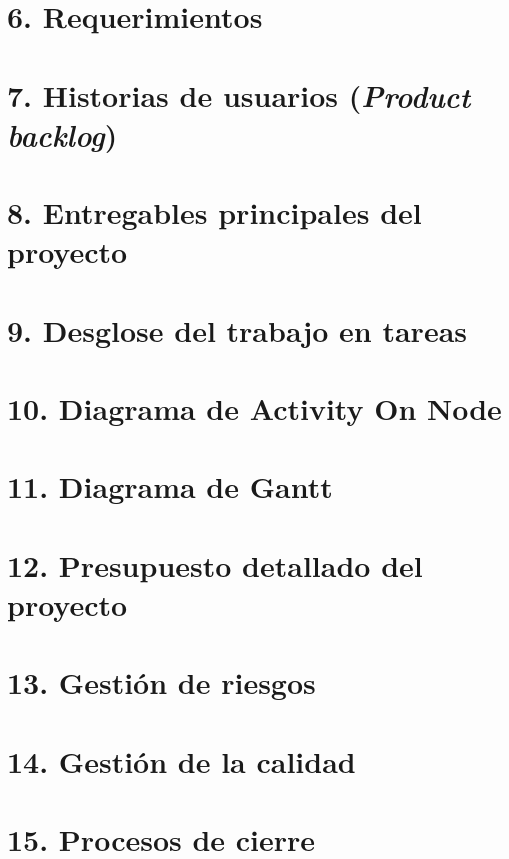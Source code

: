 \documentclass[
11pt, %
codirector, %
]{charter}
\begin{document}


\section{6. Requerimientos}
\label{sec:requerimientos}



\section{7. Historias de usuarios (\textit{Product backlog})}
\label{sec:backlog}



\section{8. Entregables principales del proyecto}
\label{sec:entregables}



\section{9. Desglose del trabajo en tareas}
\label{sec:wbs}



\section{10. Diagrama de Activity On Node}
\label{sec:AoN}



\section{11. Diagrama de Gantt}
\label{sec:gantt}



\section{12. Presupuesto detallado del proyecto}
\label{sec:presupuesto}



\section{13. Gestión de riesgos}
\label{sec:riesgos}



\section{14. Gestión de la calidad}
\label{sec:calidad}



\section{15. Procesos de cierre}
\label{sec:cierre}


\end{document}
